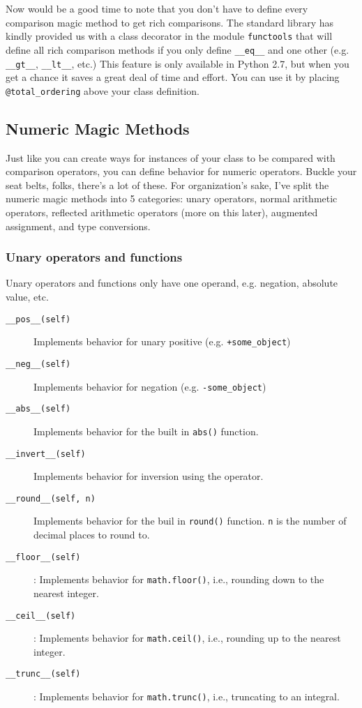 \documentclass[a4paper,11pt]{article}
\newcommand{\code}[1]{\texttt{#1}}
\begin{document}
Now would be a good time to note that you don't have to define every comparison magic method to get rich comparisons. The standard library has kindly provided us with a class decorator in the module \code{functools} that will define all rich comparison methods if you only define \code{__eq__} and one other (e.g. \code{__gt__}, \code{__lt__}, etc.) This feature is only available in Python 2.7, but when you get a chance it saves a great deal of time and effort. You can use it by placing \code{@total_ordering} above your class definition.

\subsection{Numeric Magic Methods}

Just like you can create ways for instances of your class to be compared with comparison operators, you can define behavior for numeric operators. Buckle your seat belts, folks, there's a lot of these. For organization's sake, I've split the numeric magic methods into 5 categories: unary operators, normal arithmetic operators, reflected arithmetic operators (more on this later), augmented assignment, and type conversions.

\subsubsection{Unary operators and functions}

Unary operators and functions only have one operand, e.g. negation, absolute value, etc.

\begin{description}

\item[\code{__pos__(self)}]
Implements behavior for unary positive (e.g. \code{+some_object})
\item[\code{__neg__(self)}]
Implements behavior for negation (e.g. \code{-some_object})
\item[\code{__abs__(self)}]
Implements behavior for the built in \code{abs()} function.
\item[\code{__invert__(self)}]
Implements behavior for inversion using the \code{} operator.
\item[\code{__round__(self, n)}]
Implements behavior for the buil in \code{round()} function. \code{n} is the number of decimal places to round to.
\item[\code{__floor__(self)}]
:    Implements behavior for \code{math.floor()}, i.e., rounding down to the nearest integer.
\item[\code{__ceil__(self)}]
:    Implements behavior for \code{math.ceil()}, i.e., rounding up to the nearest integer.
\item[\code{__trunc__(self)}]
:    Implements behavior for \code{math.trunc()}, i.e., truncating to an integral.

\end{description}
\end{document}
